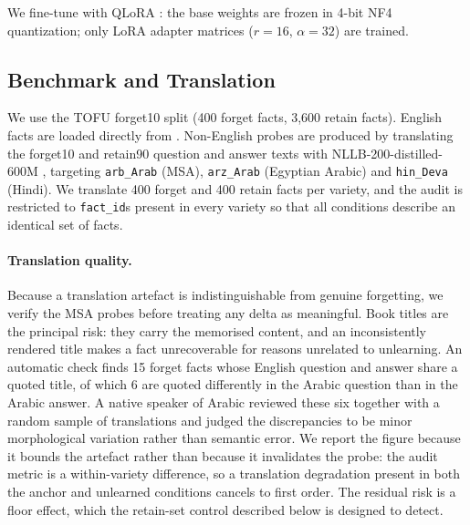 \documentclass[11pt]{article}
\begin{document}
We fine-tune with QLoRA \citep{dettmers2023qlora}: the base weights are
frozen in 4-bit NF4 quantization; only LoRA \citep{hu2022lora} adapter
matrices ($r=16$, $\alpha=32$) are trained.

\subsection{Benchmark and Translation}
We use the TOFU forget10 split (400 forget facts, 3,600 retain facts).
English facts are loaded directly from \citet{maini2024tofu}.
Non-English probes are produced by translating the forget10 and retain90
question and answer texts with NLLB-200-distilled-600M
\citep{nllbteam2022nllb}, targeting \texttt{arb\_Arab} (MSA),
\texttt{arz\_Arab} (Egyptian Arabic) and \texttt{hin\_Deva} (Hindi).
We translate 400 forget and 400 retain facts per variety, and the audit is
restricted to \texttt{fact\_id}s present in every variety so that all
conditions describe an identical set of facts.

\paragraph{Translation quality.}
Because a translation artefact is indistinguishable from genuine forgetting,
we verify the MSA probes before treating any delta as meaningful. Book titles
are the principal risk: they carry the memorised content, and an inconsistently
rendered title makes a fact unrecoverable for reasons unrelated to unlearning.
An automatic check finds 15 forget facts whose English question and answer
share a quoted title, of which 6 are quoted differently in the Arabic question
than in the Arabic answer. A native speaker of Arabic reviewed these six
together with a random sample of translations and judged the discrepancies to
be minor morphological variation rather than semantic error. We report the
figure because it bounds the artefact rather than because it invalidates the
probe: the audit metric is a within-variety difference, so a translation
degradation present in both the anchor and unlearned conditions cancels to
first order. The residual risk is a floor effect, which the retain-set control
described below is designed to detect.
\end{document}

